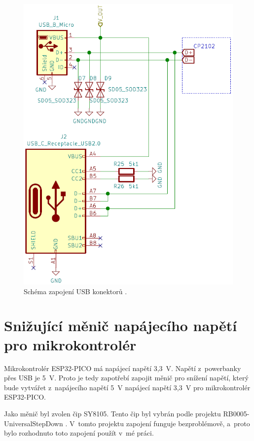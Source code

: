   \begin{figure}[!h]
    \begin{center}
      \includegraphics[scale=0.5]{obrazky/Obe_USB_schema.png}
    \end{center}
    \caption[Schéma zapojení USB konektorů \cite{USB-C}]{Schéma zapojení USB konektorů \cite{USB-C}.}
  \end{figure}

  \section{Snižující měnič napájecího napětí pro mikrokontrolér}
  Mikrokontrolér ESP32-PICO má napájecí napětí 3,3~V. Napětí z~powerbanky přes USB je 5~V. Proto je tedy zapotřebí zapojit 
  měnič pro snížení napětí, který bude vytvářet z~napájecího napětí 5~V napájecí napětí 3,3~V pro mikrokontrolér ESP32-PICO.

  Jako měnič byl zvolen čip SY8105. Tento čip byl vybrán podle projektu RB0005-UniversalStepDown \cite{UniversalStepDown}. 
  V~tomto projektu zapojení funguje bezproblémově, a~proto bylo rozhodnuto toto zapojení použít v~mé práci. 

